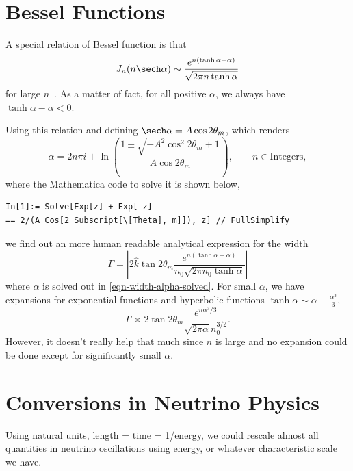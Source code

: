\section{Bessel Functions}

A special relation of Bessel function is that
\begin{equation}
  J_n(n \sech \alpha) \sim \frac{ e^{n(\tanh\alpha - \alpha)} }{\sqrt{ 2\pi n \tanh \alpha } }
\end{equation}
for large $n$~\cite{Ploumistakis2009}. As a matter of fact, for all positive $\alpha$, we always have $\tanh \alpha - \alpha < 0$.

Using this relation and defining $\sech \alpha = A \cos 2\theta_m$, which renders
\begin{equation}
  \alpha = 2 n \pi i + \ln \left(  \frac{ 1 \pm \sqrt{ -A^2 \cos^2 2\theta_m + 1 } }{ A\cos 2\theta_m } \right),\qquad n\in \mathrm{Integers},
  \label{eqn-width-alpha-solved}
\end{equation}
where the Mathematica code to solve it is shown below,
\begin{verbatim}
In[1]:= Solve[Exp[z] + Exp[-z]
== 2/(A Cos[2 Subscript[\[Theta], m]]), z] // FullSimplify
\end{verbatim}
we find out an more human readable analytical expression for the width
\begin{equation}
  \Gamma = \left\lvert 2 \hat k \tan 2\theta_m \frac{ e^{n ( \tanh \alpha - \alpha )} }{n_0 \sqrt{2\pi n_0 \tanh \alpha} } \right\rvert
\end{equation}
where $\alpha$ is solved out in \ref{eqn-width-alpha-solved}.
For small $\alpha$, we have expansions for exponential functions and hyperbolic functions $\tanh \alpha \sim \alpha - \frac{\alpha^3}{3}$,
\begin{equation}
  \Gamma \asymp 2\tan 2\theta_m \frac{ e^{n \alpha^3/3} }{\sqrt{2\pi \alpha} n_0^{3/2}  }.
\end{equation}
However, it doesn't really help that much since $n$ is large and no expansion could be done except for significantly small $\alpha$.





\section{Conversions in Neutrino Physics}

Using natural units, length = time = 1/energy, we could rescale almost all quantities in neutrino oscillations using energy, or whatever characteristic scale we have.

